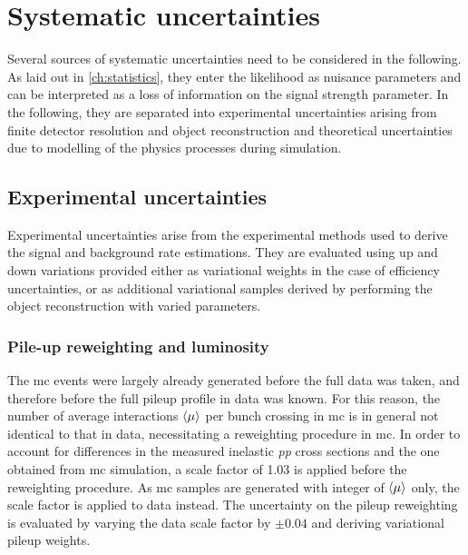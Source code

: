 

\chapter{Systematic uncertainties}

\ifpdf
    \graphicspath{{chapter-uncertainties/Figs/Raster/}{chapter-uncertainties/Figs/PDF/}{chapter-uncertainties/Figs/}}
\else
    \graphicspath{{chapter-uncertainties/Figs/Vector/}{chapter-uncertainties/Figs/}}
\fi

Several sources of systematic uncertainties need to be considered in the following. As laid out in \cref{ch:statistics}, they enter the likelihood as nuisance parameters and can be interpreted as a loss of information on the signal strength parameter. In the following, they are separated into experimental uncertainties arising from finite detector resolution and object reconstruction and theoretical uncertainties due to modelling of the physics processes during simulation. 

\section{Experimental uncertainties}

Experimental uncertainties arise from the experimental methods used to derive the signal and background rate estimations. They are evaluated using up and down variations provided either as variational weights in the case of efficiency uncertainties, or as additional variational samples derived by performing the object reconstruction with varied parameters.

\subsection{Pile-up reweighting and luminosity}

The \gls{mc} events were largely already generated before the full data was taken, and therefore before the full pileup profile in data was known. For this reason, the number of average interactions $\braket{\mu}$ per bunch crossing in \gls{mc} is in general not identical to that in data, necessitating a reweighting procedure in \gls{mc}. In order to account for differences in the measured inelastic \textit{pp} cross sections and the one obtained from \gls{mc} simulation, a scale factor of 1.03 is applied before the reweighting procedure. As \gls{mc} samples are generated with integer of $\braket{\mu}$ only, the scale factor is applied to data instead. The uncertainty on the pileup reweighting is evaluated by varying the data scale factor by $\pm 0.04$ and deriving variational pileup weights.

